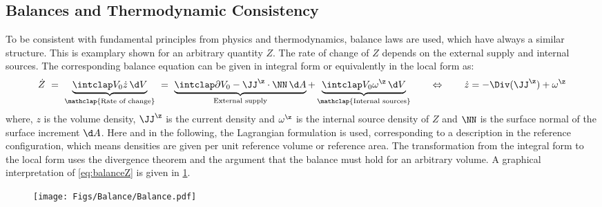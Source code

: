 \subsection{Balances and Thermodynamic Consistency}
To be consistent with fundamental principles from physics and thermodynamics, balance laws are used, which have always a similar structure. This is examplary shown for an arbitrary quantity $Z$. The rate of change of $Z$ depends on the external supply and internal sources. The corresponding balance equation can be given in integral form or equivalently in the local form as:
\begin{align}
  \dot Z  \ = \ \underbrace{ \intVO \dot z \dV}_{\mathclap{\text{Rate of change}}} \ = \ \underbrace{\intdVO -\JJ^{\z} \cdot \NN\dA}_{\text{External supply}} + \underbrace{\intVO \omega^{\z} \dV}_{\mathclap{\text{Internal sources}}} 
  \qquad \Leftrightarrow \qquad \dot z = -\Div(\JJ^{\z}) + \omega^{\z}
  \label{eq:balanceZ}
\end{align} 
where, $z$ is the volume density, $\JJ^\z$ is the current density and $\omega^\z$ is the internal source density of $Z$ and $\NN$ is the surface normal of the surface increment $\d A$. Here and in the following, the Lagrangian formulation is used, corresponding to a description in the reference configuration, which means densities are given per unit reference volume or reference area. The transformation from the integral form to the local form uses the divergence theorem and the argument that the balance must hold for an arbitrary volume. A graphical interpretation of \cref{eq:balanceZ} is given in \cref{fig:Balance}.
\begin{figure}[h!]
  \centering
  \texttt{[image: Figs/Balance/Balance.pdf]}
  \caption[]{}
  \label{fig:Balance}
\end{figure}


